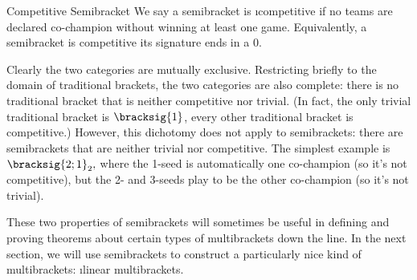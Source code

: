 {    \begin{definition}{Competitive Semibracket}{}
        We say a semibracket is \i{competitive} if no teams are declared co-champion without winning at least one game. Equivalently, a semibracket is competitive its signature ends in a $0.$
    \end{definition}

    Clearly the two categories are mutually exclusive. Restricting briefly to the domain of traditional brackets, the two categories are also complete: there is no traditional bracket that is neither competitive nor trivial. (In fact, the only trivial traditional bracket is $\bracksig{1}$, every other traditional bracket is competitive.) However, this dichotomy does not apply to semibrackets: there are semibrackets that are neither trivial nor competitive. The simplest example is $\bracksig{2;1}_2,$ where the 1-seed is automatically one co-champion (so it's not competitive), but the 2- and 3-seeds play to be the other co-champion (so it's not trivial).


    These two properties of semibrackets will sometimes be useful in defining and proving theorems about certain types of multibrackets down the line. In the next section, we will use semibrackets to construct a particularly nice kind of multibrackets: \i{linear multibrackets.}
}










